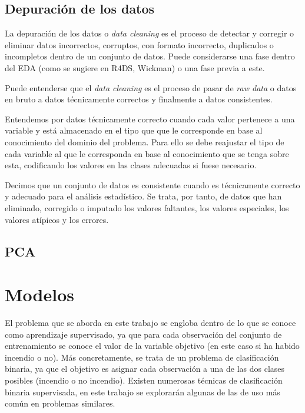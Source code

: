 \documentclass[12pt,a4paper,]{book}
\numberwithin{dummy}{section}
\theoremstyle{ocrenumbox}
\theoremstyle{blacknumex}
\theoremstyle{blacknumbox}
\theoremstyle{ocrenum}
\theoremstyle{ocrenum}
\begin{document}
\hypertarget{depuraciuxf3n-de-los-datos}{%
\subsection{Depuración de los datos}\label{depuraciuxf3n-de-los-datos}}

La depuración de los datos o \emph{data cleaning} es el proceso de
detectar y corregir o eliminar datos incorrectos, corruptos, con formato
incorrecto, duplicados o incompletos dentro de un conjunto de datos.
Puede considerarse una fase dentro del EDA (como se sugiere en R4DS,
Wickman) o una fase previa a este.

Puede entenderse que el \emph{data cleaning} es el proceso de pasar de
\emph{raw data} o datos en bruto a datos técnicamente correctos y
finalmente a datos consistentes.

Entendemos por datos técnicamente correcto cuando cada valor pertenece a
una variable y está almacenado en el tipo que que le corresponde en base
al conocimiento del dominio del problema. Para ello se debe reajustar el
tipo de cada variable al que le corresponda en base al conocimiento que
se tenga sobre esta, codificando los valores en las clases adecuadas si
fuese necesario.

Decimos que un conjunto de datos es consistente cuando es técnicamente
correcto y adecuado para el análisis estadístico. Se trata, por tanto,
de datos que han eliminado, corregido o imputado los valores faltantes,
los valores especiales, los valores atípicos y los errores.

\hypertarget{pca}{%
\subsection{PCA}\label{pca}}

\hypertarget{modelos}{%
\section{Modelos}\label{modelos}}

El problema que se aborda en este trabajo se engloba dentro de lo que se
conoce como aprendizaje supervisado, ya que para cada observación del
conjunto de entrenamiento se conoce el valor de la variable objetivo (en
este caso si ha habido incendio o no). Más concretamente, se trata de un
problema de clasificación binaria, ya que el objetivo es asignar cada
observación a una de las dos clases posibles (incendio o no incendio).
Existen numerosas técnicas de clasificación binaria supervisada, en este
trabajo se explorarán algunas de las de uso más común en problemas
similares.
\end{document}
